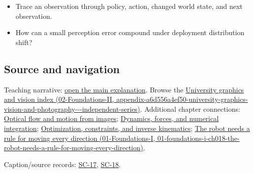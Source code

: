 \begin{itemize}
\tightlist
\item
  Trace an observation through policy, action, changed world state, and next observation.
\item
  How can a small perception error compound under deployment distribution shift?
\end{itemize}

\subsection{Source and navigation}\label{appendix-b0c42da325f1-source-and-navigation}

Teaching narrative: \hyperref[04-visual-computing-ii-ch034-robot-learning-closes-the-perception-action-loop]{open the main explanation}. Browse the \href{../02-Foundations-II/main.pdf\#nameddest=appendix-a6d556a4ef50-university-graphics-vision-and-photography---independent-series}{University graphics and vision index (02-Foundations-II, appendix-a6d556a4ef50-university-graphics-vision-and-photography-\/-\/-independent-series)}. Additional chapter connections: \hyperref[04-visual-computing-ii-ch030-optical-flow-and-motion-from-images]{Optical flow and motion from images}; \hyperref[04-visual-computing-ii-ch029-dynamics-forces-and-numerical-integration]{Dynamics, forces, and numerical integration}; \hyperref[04-visual-computing-ii-ch029-optimization-constraints-and-inverse-kinematics]{Optimization, constraints, and inverse kinematics}; \href{../01-Foundations-I/main.pdf\#nameddest=01-foundations-i-ch018-the-robot-needs-a-rule-for-moving-every-direction}{The robot needs a rule for moving every direction (01-Foundations-I, 01-foundations-i-ch018-the-robot-needs-a-rule-for-moving-every-direction)}.

Caption/source records: \hyperref[04-visual-computing-ii-ch036-sc-17---stanford-cs231n-deep-learning-for-computer-vision-spring-2025-lecture-17-robot-learning]{SC-17}, \hyperref[04-visual-computing-ii-ch036-sc-18---stanford-cs231n-deep-learning-for-computer-vision-spring-2025-lecture-18-human-centered-ai]{SC-18}.
